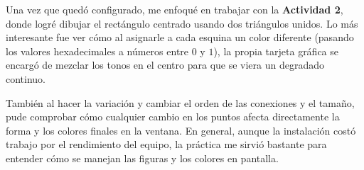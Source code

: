     Una vez que quedó configurado, me enfoqué en trabajar con la \textbf{Actividad 2}, donde logré dibujar el rectángulo centrado usando dos triángulos unidos. Lo más interesante fue ver cómo al asignarle a cada esquina un color diferente (pasando los valores hexadecimales a números entre $0$ y $1$), la propia tarjeta gráfica se encargó de mezclar los tonos en el centro para que se viera un degradado continuo. 
    
    También al hacer la variación y cambiar el orden de las conexiones y el tamaño, pude comprobar cómo cualquier cambio en los puntos afecta directamente la forma y los colores finales en la ventana. En general, aunque la instalación costó trabajo por el rendimiento del equipo, la práctica me sirvió bastante para entender cómo se manejan las figuras y los colores en pantalla.
